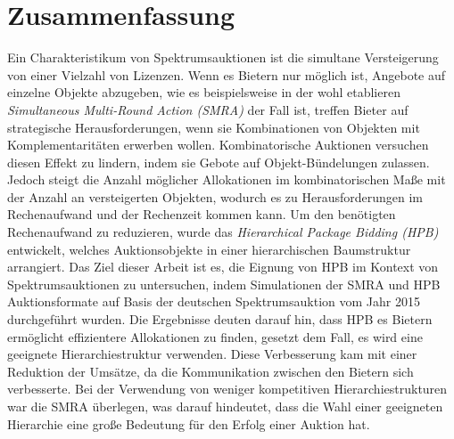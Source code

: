 \chapter{Zusammenfassung}
Ein Charakteristikum von Spektrumsauktionen ist die simultane Versteigerung von einer Vielzahl von Lizenzen. Wenn es Bietern nur möglich ist, Angebote auf einzelne Objekte abzugeben, wie es beispielsweise in der wohl etablieren \textit{Simultaneous Multi-Round Action (SMRA)} der Fall ist, treffen Bieter auf strategische Herausforderungen, wenn sie Kombinationen von Objekten mit Komplementaritäten erwerben wollen. Kombinatorische Auktionen versuchen diesen Effekt zu lindern, indem sie Gebote auf Objekt-Bündelungen zulassen. Jedoch steigt die Anzahl möglicher Allokationen im kombinatorischen Maße mit der Anzahl an versteigerten Objekten, wodurch es zu Herausforderungen im Rechenaufwand und der Rechenzeit kommen kann. Um den benötigten Rechenaufwand zu reduzieren, wurde das \textit{ Hierarchical Package Bidding (HPB)} entwickelt, welches Auktionsobjekte in einer hierarchischen Baumstruktur arrangiert. Das Ziel dieser Arbeit ist es, die Eignung von HPB im Kontext von Spektrumsauktionen zu untersuchen, indem Simulationen der SMRA und HPB Auktionsformate auf Basis der deutschen Spektrumsauktion vom Jahr 2015 durchgeführt wurden. Die Ergebnisse deuten darauf hin, dass HPB es Bietern ermöglicht effizientere Allokationen zu finden, gesetzt dem Fall, es wird eine geeignete Hierarchiestruktur verwenden. Diese Verbesserung kam mit einer Reduktion der Umsätze, da die Kommunikation zwischen den Bietern sich verbesserte. Bei der Verwendung von weniger kompetitiven Hierarchiestrukturen war die SMRA überlegen, was darauf hindeutet, dass die Wahl einer geeigneten Hierarchie eine große Bedeutung für den Erfolg einer Auktion hat.
